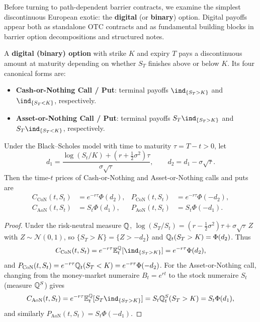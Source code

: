 Before turning to path-dependent barrier contracts, we examine the simplest discontinuous European exotic: the \textbf{digital} (or \textbf{binary}) option. Digital payoffs appear both as standalone OTC contracts and as fundamental building blocks in barrier option decompositions and structured notes.

\begin{definition}\label{def:digital-option}
    A \textbf{digital (binary) option} with strike $K$ and expiry $T$ pays a discontinuous amount at maturity depending on whether $S_T$ finishes above or below $K$. Its four canonical forms are:
    \begin{itemize}
        \item \textbf{Cash-or-Nothing Call / Put}: terminal payoffs $\ind_{\{S_T > K\}}$ and $\ind_{\{S_T < K\}}$, respectively.
        \item \textbf{Asset-or-Nothing Call / Put}: terminal payoffs $S_T\ind_{\{S_T > K\}}$ and $S_T\ind_{\{S_T < K\}}$, respectively.
    \end{itemize}
\end{definition}

\begin{theorem}\label{thm:digital-prices}
    Under the Black--Scholes model with time to maturity $\tau = T - t > 0$, let
    \[
    d_1 = \frac{\log(S_t / K) + \left(r + \frac{1}{2}\sigma^2\right)\tau}{\sigma\sqrt{\tau}}, \qquad d_2 = d_1 - \sigma\sqrt{\tau}.
    \]
    Then the time-$t$ prices of Cash-or-Nothing and Asset-or-Nothing calls and puts are
    \[
    \begin{aligned}
        C_{\mathrm{CoN}}(t, S_t) &= e^{-r\tau}\Phi(d_2), & P_{\mathrm{CoN}}(t, S_t) &= e^{-r\tau}\Phi(-d_2), \\
        C_{\mathrm{AoN}}(t, S_t) &= S_t\Phi(d_1), & P_{\mathrm{AoN}}(t, S_t) &= S_t\Phi(-d_1).
    \end{aligned}
    \]
\end{theorem}
\begin{proof}
    Under the risk-neutral measure $\mathbb{Q}$, $\log(S_T / S_t) = \left(r - \frac{1}{2}\sigma^2\right)\tau + \sigma\sqrt{\tau}\,Z$ with $Z \sim \mathcal{N}(0, 1)$, so $\{S_T > K\} = \{Z > -d_2\}$ and $\mathbb{Q}_t(S_T > K) = \Phi(d_2)$. Thus
    \[
    C_{\mathrm{CoN}}(t, S_t) = e^{-r\tau}\E_t^{\Q}[\ind_{\{S_T > K\}}] = e^{-r\tau}\Phi(d_2),
    \]
    and $P_{\mathrm{CoN}}(t, S_t) = e^{-r\tau}\mathbb{Q}_t(S_T < K) = e^{-r\tau}\Phi(-d_2)$. For the Asset-or-Nothing call, changing from the money-market numeraire $B_t = e^{rt}$ to the stock numeraire $S_t$ (measure $\mathbb{Q}^S$) gives
    \[
    C_{\mathrm{AoN}}(t, S_t) = e^{-r\tau}\E_t^{\Q}[S_T\ind_{\{S_T > K\}}] = S_t\Q_t^S(S_T > K) = S_t\Phi(d_1),
    \]
    and similarly $P_{\mathrm{AoN}}(t, S_t) = S_t\Phi(-d_1)$.
\end{proof}

